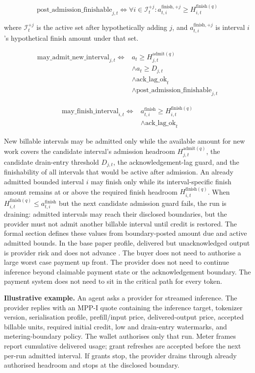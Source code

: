 \documentclass[11pt]{article}
\newcommand{\field}[1]{\texttt{\detokenize{#1}}}
\newcommand{\mppi}{MPP-I}
\begin{document}
\[
\mathrm{post\_admission\_finishable}_{j,t}
\iff
\forall i \in \mathcal{I}_t^{+j}:
a_{t,i}^{\mathrm{finish},+j} \geq H_{i,t}^{\mathrm{finish}(q)}
\]

where \(\mathcal{I}_t^{+j}\) is the active set after hypothetically adding \(j\), and \(a_{t,i}^{\mathrm{finish},+j}\) is interval \(i\)'s hypothetical finish amount under that set.

\[
\begin{aligned}
\mathrm{may\_admit\_new\_interval}_{j,t} \iff
{}&a_t \geq H_{j,t}^{\mathrm{admit}(q)}\\
&\land a_t \geq D_{j,t}\\
&\land \mathrm{ack\_lag\_ok}_t\\
&\land \mathrm{post\_admission\_finishable}_{j,t}
\end{aligned}
\]

\[
\begin{aligned}
\mathrm{may\_finish\_interval}_{i,t} \iff
{}&a_{t,i}^{\mathrm{finish}} \geq H_{i,t}^{\mathrm{finish}(q)}\\
&\land \mathrm{ack\_lag\_ok}_t
\end{aligned}
\]

New billable intervals may be admitted only while the available amount for new work covers the candidate interval's admission headroom \(H_{j,t}^{\mathrm{admit}(q)}\), the candidate drain-entry threshold \(D_{j,t}\), the acknowledgement-lag guard, and the finishability of all intervals that would be active after admission. An already admitted bounded interval \(i\) may finish only while its interval-specific finish amount remains at or above the required finish headroom \(H_{i,t}^{\mathrm{finish}(q)}\). When \(H_{i,t}^{\mathrm{finish}(q)} \leq a_{t,i}^{\mathrm{finish}}\) but the next candidate admission guard fails, the run is draining: admitted intervals may reach their disclosed boundaries, but the provider must not admit another billable interval until credit is restored. The formal section defines these values from boundary-posted amount due and active admitted bounds. In the base paper profile, delivered but unacknowledged output is provider risk and does not advance \field{cumulative_amount_due}. The buyer does not need to authorise a large worst case payment up front. The provider does not need to continue inference beyond claimable payment state or the acknowledgement boundary. The payment system does not need to sit in the critical path for every token.

\textbf{Illustrative example.} An agent asks a provider for streamed inference. The provider replies with an \mppi{} quote containing the inference target, tokenizer version, serialisation profile, prefill/input price, delivered-output price, accepted billable units, required initial credit, low and drain-entry watermarks, and metering-boundary policy. The wallet authorises only that run. Meter frames report cumulative delivered usage; grant refreshes are accepted before the next per-run admitted interval. If grants stop, the provider drains through already authorised headroom and stops at the disclosed boundary.
\end{document}
